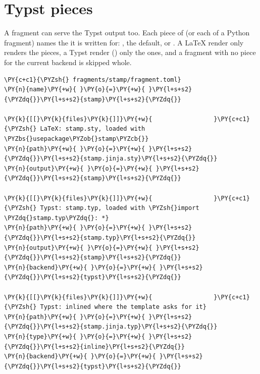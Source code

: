 \documentclass[a4paper,twoside]{article}
\begin{document}
\section{Typst pieces}
A fragment can serve the Typst output too. Each piece of 
(or each  of a Python fragment) names the  it is
written for: , the default, or . A \LaTeX{} render only renders the
 pieces, a Typst render () only the  ones, and a
fragment with no piece for the current backend is skipped whole.
\begin{tscode}[lang=toml, engine=pygments]
\begin{Verbatim}[commandchars=\\\{\},breaklines, breakanywhere, commandchars=\\\{\}]
\PY{c+c1}{\PYZsh{} fragments/stamp/fragment.toml}
\PY{n}{name}\PY{+w}{ }\PY{o}{=}\PY{+w}{ }\PY{l+s+s2}{\PYZdq{}}\PY{l+s+s2}{stamp}\PY{l+s+s2}{\PYZdq{}}

\PY{k}{[[}\PY{k}{files}\PY{k}{]]}\PY{+w}{                 }\PY{c+c1}{\PYZsh{} LaTeX: stamp.sty, loaded with \PYZbs{}usepackage\PYZob{}stamp\PYZcb{}}
\PY{n}{path}\PY{+w}{ }\PY{o}{=}\PY{+w}{ }\PY{l+s+s2}{\PYZdq{}}\PY{l+s+s2}{stamp.jinja.sty}\PY{l+s+s2}{\PYZdq{}}
\PY{n}{output}\PY{+w}{ }\PY{o}{=}\PY{+w}{ }\PY{l+s+s2}{\PYZdq{}}\PY{l+s+s2}{stamp}\PY{l+s+s2}{\PYZdq{}}

\PY{k}{[[}\PY{k}{files}\PY{k}{]]}\PY{+w}{                 }\PY{c+c1}{\PYZsh{} Typst: stamp.typ, loaded with \PYZsh{}import \PYZdq{}stamp.typ\PYZdq{}: *}
\PY{n}{path}\PY{+w}{ }\PY{o}{=}\PY{+w}{ }\PY{l+s+s2}{\PYZdq{}}\PY{l+s+s2}{stamp.typ}\PY{l+s+s2}{\PYZdq{}}
\PY{n}{output}\PY{+w}{ }\PY{o}{=}\PY{+w}{ }\PY{l+s+s2}{\PYZdq{}}\PY{l+s+s2}{stamp}\PY{l+s+s2}{\PYZdq{}}
\PY{n}{backend}\PY{+w}{ }\PY{o}{=}\PY{+w}{ }\PY{l+s+s2}{\PYZdq{}}\PY{l+s+s2}{typst}\PY{l+s+s2}{\PYZdq{}}

\PY{k}{[[}\PY{k}{files}\PY{k}{]]}\PY{+w}{                 }\PY{c+c1}{\PYZsh{} Typst: inlined where the template asks for it}
\PY{n}{path}\PY{+w}{ }\PY{o}{=}\PY{+w}{ }\PY{l+s+s2}{\PYZdq{}}\PY{l+s+s2}{stamp.jinja.typ}\PY{l+s+s2}{\PYZdq{}}
\PY{n}{type}\PY{+w}{ }\PY{o}{=}\PY{+w}{ }\PY{l+s+s2}{\PYZdq{}}\PY{l+s+s2}{inline}\PY{l+s+s2}{\PYZdq{}}
\PY{n}{backend}\PY{+w}{ }\PY{o}{=}\PY{+w}{ }\PY{l+s+s2}{\PYZdq{}}\PY{l+s+s2}{typst}\PY{l+s+s2}{\PYZdq{}}
\end{Verbatim}
\end{tscode}
\end{document}
